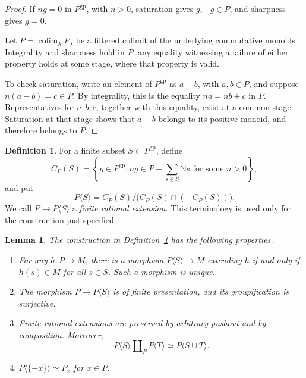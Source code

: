 \documentclass[11pt]{article}
\newtheorem{lemma}[theorem]{Lemma}
\theoremstyle{definition}
\newtheorem{definition}[theorem]{Definition}
\theoremstyle{remark}
\DeclareMathOperator{\colim}{colim}
\newcommand{\gp}{\mathrm{gp}}
\newcommand{\NN}{\mathbb N}
\begin{document}
\begin{proof}
If \(ng=0\) in \(P^{\gp}\), with \(n>0\), saturation gives
\(g,-g\in P\), and sharpness gives \(g=0\).

Let \(P=\colim_\lambda P_\lambda\) be a filtered colimit of the
underlying commutative monoids. Integrality and sharpness hold in
\(P\): any equality witnessing a failure of either property holds at
some stage, where that property is valid.

To check saturation, write an element of \(P^{\gp}\) as \(a-b\), with
\(a,b\in P\), and suppose \(n(a-b)=c\in P\). By integrality, this is
the equality \(na=nb+c\) in \(P\). Representatives for \(a,b,c\),
together with this equality, exist at a common stage. Saturation at
that stage shows that \(a-b\) belongs to its positive monoid, and
therefore belongs to \(P\).
\end{proof}

\begin{definition}\label{def:rational}
For a finite subset \(S\subset P^{\gp}\), define
\[
C_P(S)=
\left\{g\in P^{\gp}:
ng\in P+\sum_{s\in S}\NN s
\text{ for some }n>0\right\},
\]
and put
\[
P\langle S\rangle=
C_P(S)/\bigl(C_P(S)\cap(-C_P(S))\bigr).
\]
We call \(P\to P\langle S\rangle\) a \emph{finite rational extension}.
This terminology is used only for the construction just specified.
\end{definition}

\begin{lemma}\label{lem:rational}
The construction in Definition~\ref{def:rational} has the following
properties.
\begin{enumerate}[label=\textup{(\roman*)}]
\item For any \(h:P\to M\), there is a morphism
\(P\langle S\rangle\to M\) extending \(h\) if and only if
\(h(s)\in M\) for all \(s\in S\). Such a morphism is unique.
\item The morphism \(P\to P\langle S\rangle\) is of finite
presentation, and its groupification is surjective.
\item Finite rational extensions are preserved by arbitrary
pushout and by composition. Moreover,
\[
P\langle S\rangle\amalg_P P\langle T\rangle
\simeq P\langle S\cup T\rangle.
\]
\item \(P\langle\{-x\}\rangle\simeq P_x\) for \(x\in P\).
\end{enumerate}
\end{lemma}
\end{document}
